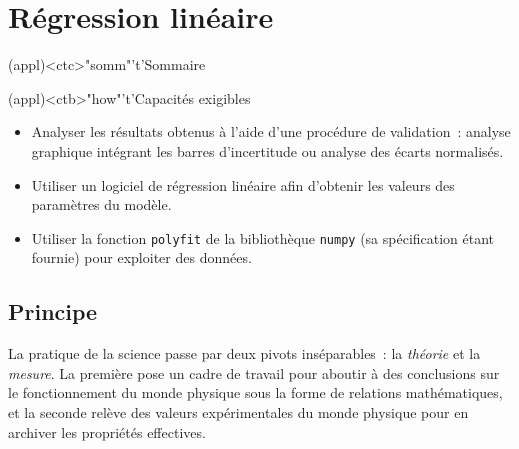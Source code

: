 \documentclass[a4paper, 12pt, garamond]{book}
\begin{document}
\setcounter{chapter}{2}


\chapter{Régression linéaire}

\vspace*{\fill}

\begin{tcn}(appl)<ctc>"somm"'t'{Sommaire}
	\let\item\olditem
	\vspace{-15pt}
	\minitoc
	\vspace{-25pt}
\end{tcn}

\begin{tcn}(appl)<ctb>"how"'t'{Capacités exigibles}
	\begin{itemize}[label=\rcheck]
		\item Analyser les résultats obtenus à l'aide d'une procédure de
		      validation~: analyse graphique intégrant les barres d'incertitude ou
		      analyse des écarts normalisés.
		\item Utiliser un logiciel de régression linéaire afin d'obtenir les
		      valeurs des paramètres du modèle.
		\item Utiliser la fonction \texttt{polyfit} de la bibliothèque
		      \texttt{numpy} (sa spécification étant fournie) pour exploiter des
		      données.
	\end{itemize}
\end{tcn}

\vspace*{\fill}
\newpage

\section{Principe}

La pratique de la science passe par deux pivots inséparables~: la
\textit{théorie} et la \textit{mesure}. La première pose un cadre de travail
pour aboutir à des conclusions sur le fonctionnement du monde physique sous la
forme de relations mathématiques, et la seconde relève des valeurs
expérimentales du monde physique pour en archiver les propriétés effectives.
\end{document}
